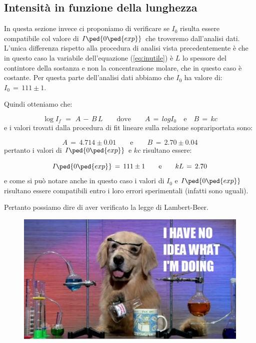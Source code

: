 \subsection{Intensità in funzione della lunghezza}

In questa sezione invece ci proponiamo di verificare se $I_0$ risulta essere compatibile col valore di $I\ped{0\ped{exp}}$ che troveremo dall'analisi dati. L'unica differenza rispetto alla procedura di analisi vista precedentemente è che in questo caso la variabile dell'equazione (\ref{eq:inutile}) è $L$ lo spessore del contintore della sostanza e non la concentrazione molare, che in questo caso è costante.
Per questa parte dell'analisi dati abbiamo che $I_0$ ha valore di: $I_0 \,=\, 111 \pm 1$.

Quindi otteniamo che:

\begin{equation}
	\log{I_f} \,\,=\,\, A \,-\, B \, L \qquad \text{dove} \qquad A \,=\, log{I_0} \quad \text{e} \quad B\,=\, kc
	\label{eq:fit}
\end{equation}
%
e i valori trovati dalla procedura di fit lineare sulla relazione soprariportata sono:

\begin{equation*}
	A \,=\, 4.714 \pm 0.01 \qquad \text{e} \qquad B \,=\, 2.70 \pm 0.04
\end{equation*}
%
pertanto i valori di $I\ped{0\ped{exp}}$ e $kc$ risultano essere:

\begin{equation}
	I\ped{0\ped{exp}} \,=\, 111 \pm 1 \qquad \text{e} \qquad kL \,=\, 2.70
\end{equation}
%
e come si può notare anche in questo caso i valori di $I_0$ e $I\ped{0\ped{exp}}$  risultano essere compatibili entro i loro errori sperimentali (infatti sono uguali).

Pertanto possiamo dire di aver verificato la legge di Lambert-Beer.

\begin{figure}[hbtp]
        \centering
        \includegraphics[scale=0.4]{chem_dog.pdf}
\end{figure}
